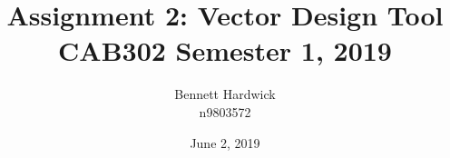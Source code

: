 \documentclass{article}
\title{Assignment 2: Vector Design Tool\\CAB302 Semester 1, 2019}
\date{June 2, 2019}
\author{Bennett Hardwick \\ n9803572}
\begin{document}
	\maketitle

  \pagebreak

  \tableofcontents

  \pagebreak

  
  
  
  
  
  

	
\end{document}
